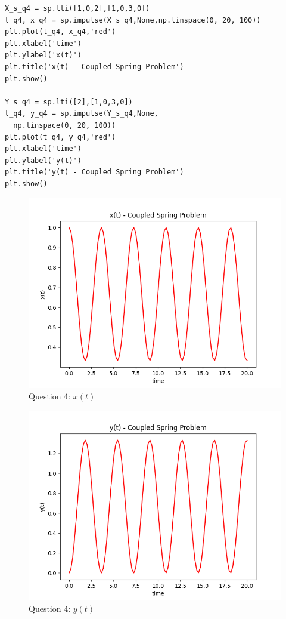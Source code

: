 \documentclass[11pt, a4paper]{article}
\begin{document}
\begin{verbatim}
X_s_q4 = sp.lti([1,0,2],[1,0,3,0])
t_q4, x_q4 = sp.impulse(X_s_q4,None,np.linspace(0, 20, 100))
plt.plot(t_q4, x_q4,'red')
plt.xlabel('time')
plt.ylabel('x(t)')
plt.title('x(t) - Coupled Spring Problem')
plt.show()

Y_s_q4 = sp.lti([2],[1,0,3,0])
t_q4, y_q4 = sp.impulse(Y_s_q4,None,
  np.linspace(0, 20, 100))
plt.plot(t_q4, y_q4,'red')
plt.xlabel('time')
plt.ylabel('y(t)')
plt.title('y(t) - Coupled Spring Problem')
plt.show()
\end{verbatim}

\begin{figure}[!tbh]
   	\centering
  \includegraphics[scale=0.5]{Q4-1.png} 
    \caption{Question 4: $x(t)$} 	
    \label{time response x q4}
   \end{figure} 


\begin{figure}[!tbh]
   	\centering
  \includegraphics[scale=0.5]{Q4-2.png} 
    \caption{Question 4: $y(t)$} 	
    \label{time response y q4}
   \end{figure} 
\end{document}
